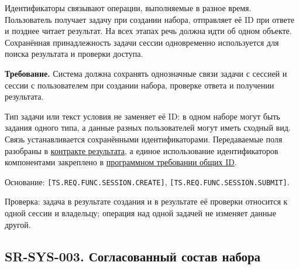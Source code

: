 \documentclass[12pt,a4paper]{article}
\begin{document}
\hypertarget{sr-sys-002-связность-данных-задачи}{}

Идентификаторы связывают операции, выполняемые в разное время. Пользователь получает задачу при создании набора, отправляет её ID при ответе и позднее читает результат. На всех этапах речь должна идти об одном объекте. Сохранённая принадлежность задачи сессии одновременно используется для поиска результата и проверки доступа.

\textbf{Требование.} Система должна сохранять однозначные связи задачи с сессией и сессии с пользователем при создании набора, проверке ответа и получении результата.

Тип задачи или текст условия не заменяет её ID: в одном наборе могут быть задания одного типа, а данные разных пользователей могут иметь сходный вид. Связь устанавливается сохранёнными идентификаторами. Передаваемые поля разобраны в \href{../07_\%D0\%9F\%D1\%80\%D0\%BE\%D0\%B3\%D1\%80\%D0\%B0\%D0\%BC\%D0\%BC\%D0\%BD\%D1\%8B\%D0\%B5_\%D1\%82\%D1\%80\%D0\%B5\%D0\%B1\%D0\%BE\%D0\%B2\%D0\%B0\%D0\%BD\%D0\%B8\%D1\%8F/DOC-06.2_\%D0\%A1\%D0\%B5\%D1\%81\%D1\%81\%D0\%B8\%D0\%B8_\%D0\%B7\%D0\%B0\%D0\%B4\%D0\%B0\%D1\%87_\%D0\%B8_\%D0\%BF\%D0\%BB\%D0\%B0\%D0\%BD\%D0\%B8\%D1\%80\%D0\%BE\%D0\%B2\%D1\%89\%D0\%B8\%D0\%BA.pdf\#nameddest=\%D1\%80\%D0\%B5\%D0\%B7\%D1\%83\%D0\%BB\%D1\%8C\%D1\%82\%D0\%B0\%D1\%82-\%D0\%B8-\%D0\%BE\%D1\%82\%D0\%BA\%D0\%B0\%D0\%B7\%D1\%8B}{контракте результата}, а единое использование идентификаторов компонентами закреплено в \href{../07_\%D0\%9F\%D1\%80\%D0\%BE\%D0\%B3\%D1\%80\%D0\%B0\%D0\%BC\%D0\%BC\%D0\%BD\%D1\%8B\%D0\%B5_\%D1\%82\%D1\%80\%D0\%B5\%D0\%B1\%D0\%BE\%D0\%B2\%D0\%B0\%D0\%BD\%D0\%B8\%D1\%8F/DOC-06_\%D0\%9F\%D1\%80\%D0\%BE\%D0\%B3\%D1\%80\%D0\%B0\%D0\%BC\%D0\%BC\%D0\%BD\%D1\%8B\%D0\%B5_\%D1\%82\%D1\%80\%D0\%B5\%D0\%B1\%D0\%BE\%D0\%B2\%D0\%B0\%D0\%BD\%D0\%B8\%D1\%8F.pdf\#nameddest=swr-sys-002-\%D0\%BE\%D0\%B1\%D1\%89\%D0\%B8\%D0\%B5-\%D0\%B8\%D0\%B4\%D0\%B5\%D0\%BD\%D1\%82\%D0\%B8\%D1\%84\%D0\%B8\%D0\%BA\%D0\%B0\%D1\%82\%D0\%BE\%D1\%80\%D1\%8B}{программном требовании общих ID}.

Основание: \texttt{[TS.\allowbreak{}REQ.\allowbreak{}FUNC.\allowbreak{}SESSION.\allowbreak{}CREATE]}, \texttt{[TS.\allowbreak{}REQ.\allowbreak{}FUNC.\allowbreak{}SESSION.\allowbreak{}SUBMIT]}.

Проверка: задача в результате создания и в результате её проверки относится к одной сессии и владельцу; операция над одной задачей не изменяет данные другой.

\subsection{SR-SYS-003. Согласованный состав набора}\label{sr-sys-003-ux441ux43eux433ux43bux430ux441ux43eux432ux430ux43dux43dux44bux439-ux441ux43eux441ux442ux430ux432-ux43dux430ux431ux43eux440ux430}
\end{document}
